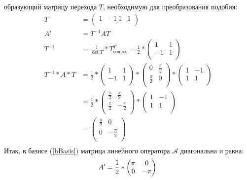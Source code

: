 \documentclass[12pt, a4paper]{article}
\begin{document}
образующий матрицу перехода $T$, необходимую для преобразования подобия:
\begin{equation*}
\begin{aligned}
T &=\begin{pmatrix}
1 & -1 \
1 & 1  \\
\end{pmatrix}\\
A' &= T^{-1}AT\\
T^{-1} &= \frac{1}{\det T} * T_{\text{союзн.}}^T = \frac{1}{2} * \begin{pmatrix}
1 & 1 \\
-1 & 1  \\
\end{pmatrix}\\
T^{-1}*A*T &= \frac{1}{2} * \begin{pmatrix}
1 & 1 \\
-1 & 1  \\
\end{pmatrix} *\begin{pmatrix}
0 & \frac{\pi}{2} \\
\frac{\pi}{2} & 0 \\
\end{pmatrix} * \begin{pmatrix}
1 & -1 \\
1 & 1  \\
\end{pmatrix}\\
&= \frac{1}{2}*\begin{pmatrix}
\frac{\pi}{2} & \frac{\pi}{2}\\
\frac{\pi}{2} & -\frac{\pi}{2}\\
\end{pmatrix} * \begin{pmatrix}
1 & -1 \\
1 & 1  \\
\end{pmatrix}\\ 
&= \begin{pmatrix}
\frac{\pi}{2} & 0\\
0 & -\frac{\pi}{2}\\
\end{pmatrix}\\
\end{aligned}
\end{equation*}
Итак, в базисе (\ref{bBasis}) матрица линейного оператора $\mathcal{A}$ диагональна и равна:
\begin{equation*}
A' =\frac{1}{2}*\begin{pmatrix}
\pi & 0\\
0 & -\pi\\
\end{pmatrix}\\
\end{equation*}
\end{document}
